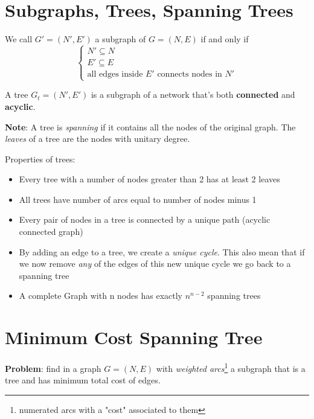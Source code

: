     \section{Subgraphs, Trees, Spanning Trees}
        We call $G' = (N', E')$ a subgraph of $G = (N, E)$ if and only if
        \begin{equation}
            \begin{cases}
                N' \subseteq N \\
                E' \subseteq E \\
                \text{all edges inside $E'$ connects nodes in $N'$}
            \end{cases}
        \end{equation}
        \begin{definition}[Tree]
            A tree $G_t = (N', E')$ is a subgraph of a network that's both \textbf{connected} and \textbf{acyclic}.
        \end{definition}

        \textbf{Note}: A tree is \textit{spanning} if it contains all the nodes of the original graph. The \textit{leaves} of a tree are the nodes with unitary degree.

        Properties of trees:
        \begin{itemize}
            \item Every tree with a number of nodes greater than 2 has at least 2 leaves
            \item All trees have number of arcs equal to number of nodes minus 1
            \item Every pair of nodes in a tree is connected by a unique path (acyclic connected graph)
            \item By adding an edge to a tree, we create a \textit{unique cycle}. This also mean that if we now remove \textit{any} of the edges of this new unique cycle we go back to a spanning tree
            \item A complete Graph with n nodes has exactly $n^{n-2}$ spanning trees
        \end{itemize}

    \section{Minimum Cost Spanning Tree}
        \textbf{Problem}: find in a graph $G = (N, E)$ with \textit{weighted arcs}\footnote{numerated arcs with a "cost" associated to them} a subgraph that is a tree and has minimum total cost of edges.
        
